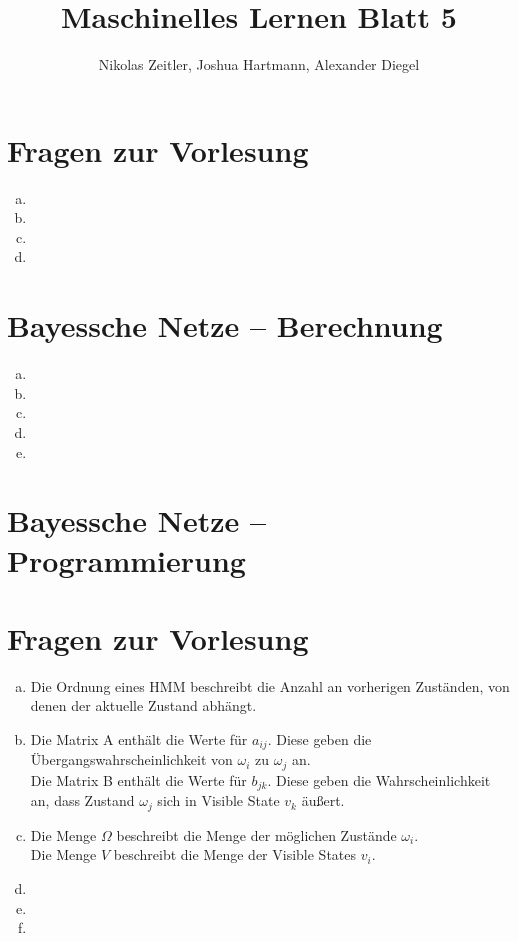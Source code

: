 \documentclass[a4paper]{scrartcl}
\author{Nikolas Zeitler, Joshua Hartmann, Alexander Diegel}
\title{Maschinelles Lernen Blatt 5}
\begin{document}
\maketitle
\section{Fragen zur Vorlesung}

\begin{enumerate}[a)]
	\item 
	\item 
	\item 
	\item 
\end{enumerate}


\section{Bayessche Netze – Berechnung}

\begin{enumerate}[(a)]
	\item 
	\item 
	\item 
	\item 
	\item 
\end{enumerate}


\section{Bayessche Netze – Programmierung}



\section{Fragen zur Vorlesung}

\begin{enumerate}[(a)]
	\item Die Ordnung eines HMM beschreibt die Anzahl an vorherigen Zuständen, von denen der aktuelle Zustand abhängt.
	
	\item Die Matrix A enthält die Werte für $a_{ij}$. Diese geben die Übergangswahrscheinlichkeit von $\omega_i$ zu $\omega_j$ an.\\
	
	Die Matrix B enthält die Werte für $b_{jk}$. Diese geben die Wahrscheinlichkeit an, dass Zustand $\omega_j$ sich in Visible State $v_k$ äußert.\\
	
	\item Die Menge $\Omega$ beschreibt die Menge der möglichen Zustände $\omega_i$.\\
	
	Die Menge $V$ beschreibt die Menge der Visible States $v_i$.
	\item 
	\item 
	\item 
\end{enumerate}
\end{document}
